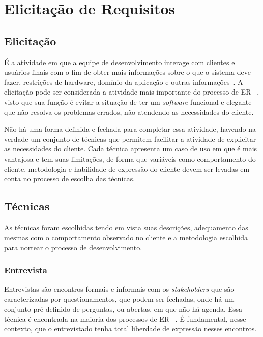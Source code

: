 \chapter{Elicitação de Requisitos}
\label{elicitation}

\section{Elicitação}

É a atividade em que a equipe de desenvolvimento interage com clientes e usuários finais com o fim de obter mais informações sobre o que o sistema deve fazer, restrições de hardware, domínio da aplicação e outras informações~\cite{sommerville}. A elicitação pode ser considerada a atividade mais importante do processo de ER ~\cite{goguen}, visto que sua função é evitar a situação de ter um \textit{software} funcional e elegante que não resolva os problemas errados, não atendendo as necessidades do cliente.~\cite{pressman}

Não há uma forma definida e fechada para completar essa atividade, havendo na verdade um conjunto de técnicas que permitem facilitar a atividade de explicitar as necessidades do cliente.  Cada técnica apresenta um caso de uso em que é mais vantajosa e tem suas limitações, de forma que variáveis como comportamento do cliente, metodologia e habilidade de expressão do cliente devem ser levadas em conta no processo de escolha das técnicas.

\section{Técnicas}

As técnicas foram escolhidas tendo em vista suas descrições, adequamento das mesmas com o comportamento observado no cliente e a metodologia escolhida para nortear o processo de desenvolvimento.

\subsection{Entrevista}

Entrevistas são encontros formais e informais com os \textit{stakeholders} que são caracterizadas por questionamentos, que podem ser fechadas, onde há um conjunto pré-definido de perguntas, ou abertas, em que não há agenda. Essa técnica é encontrada na maioria dos processos de ER ~\cite{sommerville}. É fundamental, nesse contexto, que o entrevistado tenha total liberdade de expressão nesses encontros.

